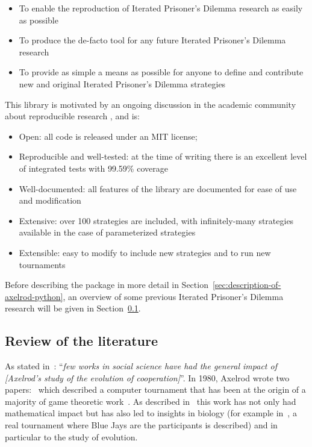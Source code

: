 \documentclass{article}
\begin{document}
\begin{itemize}
    \item To enable the reproduction of Iterated Prisoner's Dilemma
    research as easily as possible
    \item To produce the de-facto tool for any future Iterated Prisoner's
    Dilemma research
    \item To provide as simple a means as possible for anyone to define and
    contribute new and original Iterated Prisoner's Dilemma strategies
\end{itemize}

This library is motivated by an ongoing discussion in the academic community
about reproducible research \cite{Crick2014a, Hong2015a, Prlic2012, Sandve2013},
and is:

\begin{itemize}
    \item Open: all code is released under an MIT license;
    \item Reproducible and well-tested: at the time of writing there is an excellent level of
        integrated tests with 99.59\% coverage
    \item Well-documented: all features of the library are documented for ease of
        use and modification
    \item Extensive: over 100 strategies are included, with infinitely-many
    strategies available in the case of parameterized strategies
    \item Extensible: easy to modify to include new strategies and to run new tournaments
\end{itemize}

Before describing the package in more detail in
Section~\ref{sec:description-of-axelrod-python}, an overview of some previous
Iterated Prisoner's Dilemma research will be given in
Section~\ref{sec:review}.

\subsection{Review of the literature}\label{sec:review}

As stated in~\cite{Bendor1991}: ``\textit{few works in social science have had
the general impact of [Axelrod's study of the evolution of cooperation]}''.  In
1980, Axelrod wrote two papers:~\cite{Axelrod1980a,Axelrod1980b} which
described a computer tournament that has been at the origin of a majority of
game theoretic work~\cite{Banks1990, Bendor1991, Boyd1987, Chellapilla1999,
DavidB1993, Doebeli2005, Ellison1994, Gotts2003, Hilbe2013, Isaac2008,
Kraines1989, Lee2015, Lorberbaum1994, Milgrom1982, Molander1985, Murnighan2015,
Press2012, Stephens2002, Stewart2012}. As described in~\cite{Bendor1991} this
work has not only had mathematical impact but has also led to insights in
biology (for example in~\cite{Stephens2002}, a real tournament where Blue Jays
are the participants is described) and in particular to the study of evolution.
\end{document}

